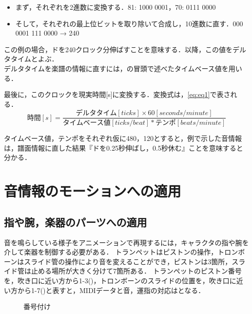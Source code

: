 \begin{itemize}
	\item まず，それぞれを2進数に変換する．\hspace{1mm}81: 1000 0001，70: 0111 0000
	\item そして，それぞれの最上位ビットを取り除いて合成し，10進数に直す．\hspace{1mm}000 0001 111 0000 → 240
\end{itemize}

この例の場合，ドを240クロック分伸ばすことを意味する．以降，この値をデルタタイムとよぶ．\\
\indent
デルタタイムを楽譜の情報に直すには，の冒頭で述べたタイムベース値を用いる．


最後に，このクロックを現実時間[s]に変換する．変換式は，\eqref{eq:eq1}で表される．
\begin{equation}
\label{eq:eq1}
時間[s] = 
\frac {デルタタイム[ticks] × 60[seconds/minute]}{タイムベース値[ticks/beat] * テンポ[beats/minute]}
\end{equation}

タイムベース値，テンポをそれぞれ仮に480，120とすると，例で示した音情報は，譜面情報に直した結果『ドを0.25秒伸ばし，0.5秒休む』ことを意味すると分かる．

\section{音情報のモーションへの適用} \label{adapt}
\subsection{指や腕，楽器のパーツへの適用}
音を鳴らしている様子をアニメーションで再現するには，キャラクタの指や腕を介して楽器を制御する必要がある．
トランペットはピストンの操作，トロンボーンはスライド管の操作により音を変えることができ，ピストンは3箇所，スライド管は止める場所が大きく分けて7箇所ある．
トランペットのピストン番号を，吹き口に近い方から1-3()，トロンボーンのスライドの位置を，吹き口に近い方から1-7()と表すと，MIDIデータと音，運指の対応はとなる．

\begin{figure}[t]
	\centering
	\caption{番号付け}
	\label{fig:numbering}
\end{figure}


